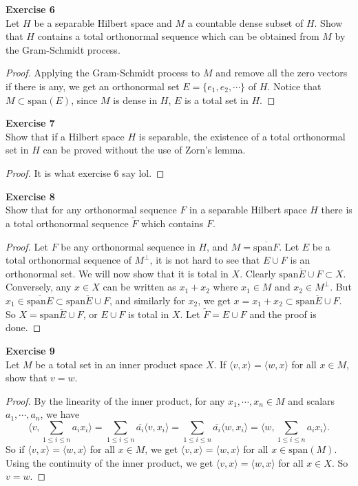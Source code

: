 \documentclass[12pt, a4paper]{article}
\theoremstyle{plain}
\newenvironment{exercise}[2][Exercise]
    { \begin{mdframed}[backgroundcolor=gray!20] \textbf{#1 #2} \\}
    {  \end{mdframed}}
\begin{document}
\begin{exercise}{6}
Let $H$ be a separable Hilbert space and $M$ a countable dense subset of $H$. Show that $H$ contains a total orthonormal sequence which can be obtained from $M$ by the Gram-Schmidt process.
\end{exercise}
	\begin{proof}
	Applying the Gram-Schmidt process to $M$ and remove all the zero vectors if there is any, we get an orthonormal set $E = \{e_1,e_2,\cdots\}$ of $H$. Notice that $M\subset \text{span}(E)$, since $M$ is dense in $H$, $E$ is a total set in $H$.
	\end{proof}

\begin{exercise}{7}
Show that if a Hilbert space $H$ is separable, the existence of a total orthonormal set in $H$ can be proved without the use of Zorn's lemma.
\end{exercise}
	\begin{proof}
	It is what exercise 6 say lol.
	\end{proof}

\begin{exercise}{8}
Show that for any orthonormal sequence $F$ in a separable Hilbert space $H$ there is a total orthonormal sequence $\tilde{F}$ which contains $F$.
\end{exercise}
	\begin{proof}
	Let $F$ be any orthonormal sequence in $H$, and $M = \overline{\text{span} F}$. Let $E$ be a total orthonormal sequence of $M^\perp$, it is not hard to see that $E\cup F$ is an orthonormal set. We will now show that it is total in $X$. Clearly $\overline{\text{span} E\cup F}\subset X$. Conversely, any $x\in X$ can be written as $x_1+x_2$ where $x_1\in M$ and $x_2\in M^\perp$. But $x_1\in \overline{\text{span} E}\subset \overline{\text{span} E\cup F}$, and similarly for $x_2$, we get $x=x_1+x_2\subset \overline{\text{span} E\cup F}$. So $X = \overline{\text{span} E\cup F}$, or $E\cup F$ is total in $X$. Let $\tilde{F} = E\cup F$ and the proof is done.
	\end{proof}

\begin{exercise}{9}
Let $M$ be a total set in an inner product space $X$. If $\langle{v,x}\rangle = \langle{w,x}\rangle$ for all $x\in M$, show that $v=w$. 
\end{exercise}
	\begin{proof}
	By the linearity of the inner product, for any $x_1,\cdots,x_n \in M$ and scalars $a_1,\cdots,a_n$, we have
	\[
	\langle{v,\sum_{1\leq i\leq n}{a_ix_i}}\rangle = \sum_{1\leq i\leq n}{\overline{a_i}\langle{v,x_i}\rangle} = \sum_{1\leq i\leq n}{\overline{a_i}\langle{w,x_i}\rangle} = \langle{w,\sum_{1\leq i\leq n}{a_ix_i}}\rangle.
	\]
	So if $\langle{v,x}\rangle =\langle{w,x}\rangle$ for all $x\in M$, we get $\langle{v,x}\rangle =\langle{w,x}\rangle$ for all $x\in \text{span}(M)$. Using the continuity of the inner product, we get $\langle{v,x}\rangle = \langle{w,x}\rangle$ for all $x\in X$. So $v=w$.
	\end{proof}
\end{document}

